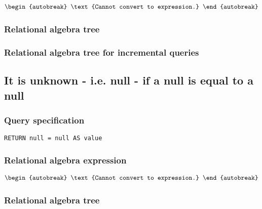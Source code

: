 \begin{align*}
\begin{autobreak}
\text{Cannot convert to expression.}
\end{autobreak}
\end{align*}

\subsubsection*{Relational algebra tree}


\subsubsection*{Relational algebra tree for incremental queries}


\subsection{It is unknown - i.e. null - if a null is equal to a null}

\subsubsection*{Query specification}

\begin{lstlisting}
RETURN null = null AS value
\end{lstlisting}

\subsubsection*{Relational algebra expression}

\begin{align*}
\begin{autobreak}
\text{Cannot convert to expression.}
\end{autobreak}
\end{align*}

\subsubsection*{Relational algebra tree}


